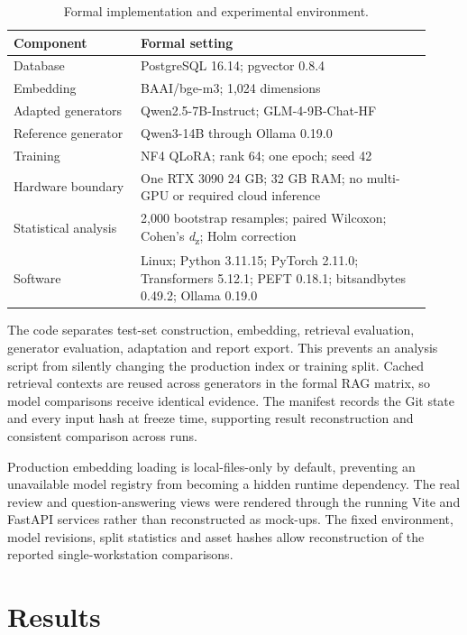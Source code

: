 \begin{table}[ht]
\centering
\caption{Formal implementation and experimental environment.}

\begin{tabular}{p{0.28\linewidth}p{0.64\linewidth}}
\toprule
Component & Formal setting \\
\midrule
Database & PostgreSQL 16.14; pgvector 0.8.4 \\
Embedding & BAAI/bge-m3; 1,024 dimensions \\
Adapted generators & Qwen2.5-7B-Instruct; GLM-4-9B-Chat-HF \\
Reference generator & Qwen3-14B through Ollama 0.19.0 \\
Training & NF4 QLoRA; rank 64; one epoch; seed 42 \\
Hardware boundary & One RTX 3090 24 GB; 32 GB RAM; no multi-GPU or required cloud inference \\
Statistical analysis & 2,000 bootstrap resamples; paired Wilcoxon; Cohen's \emph{d}\textsubscript{z}; Holm correction \\
Software & Linux; Python 3.11.15; PyTorch 2.11.0; Transformers 5.12.1; PEFT 0.18.1; bitsandbytes 0.49.2; Ollama 0.19.0 \\
\bottomrule
\end{tabular}
\end{table}

The code separates test-set construction, embedding, retrieval evaluation, generator evaluation, adaptation and report export. This prevents an analysis script from silently changing the production index or training split. Cached retrieval contexts are reused across generators in the formal RAG matrix, so model comparisons receive identical evidence. The manifest records the Git state and every input hash at freeze time, supporting result reconstruction and consistent comparison across runs.

Production embedding loading is local-files-only by default, preventing an unavailable model registry from becoming a hidden runtime dependency. The real review and question-answering views were rendered through the running Vite and FastAPI services rather than reconstructed as mock-ups. The fixed environment, model revisions, split statistics and asset hashes allow reconstruction of the reported single-workstation comparisons.

\section{Results}

